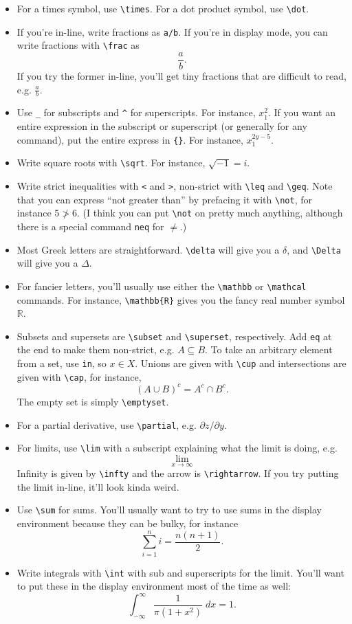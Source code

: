 \documentclass[12pt]{article}
\begin{document}
	\begin{itemize}
		\item For a times symbol, use \verb|\times|. For a dot product symbol, use \verb|\dot|. 
		\item If you're in-line, write fractions as \verb|a/b|. If you're in display mode, you can write fractions with \verb|\frac| as \[ \frac{a}{b}. \]
		If you try the former in-line, you'll get tiny fractions that are difficult to read, e.g. $\frac{a}{b}$. 
		\item Use \verb|_| for subscripts and \verb|^| for superscripts. For instance, $x_1^2$. If you want an entire expression in the subscript or superscript (or generally for any command), put the entire express in \verb|{}|. For instance, $x_1^{2y-5}$. 
		\item Write square roots with \verb|\sqrt|. For instance, $\sqrt{-1}=i$. 
		\item Write strict inequalities with \verb|<| and \verb|>|, non-strict with \verb|\leq| and \verb|\geq|. Note that you can express ``not greater than'' by prefacing it with  \verb|\not|, for instance $5 \not > 6$. (I think you can put \verb|\not| on pretty much anything, although there is a special command \verb|neq| for $\neq$.)
		\item Most Greek letters are straightforward. \verb|\delta| will give you a $\delta$, and \verb|\Delta| will give you a $\Delta$. 
		\item For fancier letters, you'll usually use either the \verb|\mathbb| or \verb|\mathcal| commands. For instance, \verb|\mathbb{R}| gives you the fancy real number symbol $\mathbb{R}$.
		\item Subsets and supersets are \verb|\subset| and \verb|\superset|, respectively. Add \verb|eq| at the end to make them non-strict, e.g. $A \subseteq B$. To take an arbitrary element from a set, use \verb|in|, so $x \in X$. Unions are given with \verb|\cup| and intersections are given with \verb|\cap|, for instance,  
			\[	(A \cup B)^c=A^c \cap B^c . \]
		The empty set is simply \verb|\emptyset|. 
		\item For a partial derivative, use \verb|\partial|, e.g. $\partial z/\partial y$. 
		\item For limits, use \verb|\lim| with a subscript explaining what the limit is doing, e.g.
			\[ \lim_{x \rightarrow \infty}  \]
			Infinity is given by \verb|\infty| and  the arrow is \verb|\rightarrow|. If you try putting the limit in-line, it'll look kinda weird. 
		\item Use \verb|\sum| for sums. You'll usually want to try to use sums in the display environment because they can be bulky, for instance
			\[\sum_{i=1}^n i = \frac{n(n+1)}{2}.\]
		\item Write integrals with \verb|\int| with sub and superscripts for the limit. You'll want to put these in the display environment most of the time as well:
			\[ \int_{-\infty}^{\infty} \frac{1}{\pi(1+x^2)} \; dx = 1 .\]
	\end{itemize}
\end{document}
